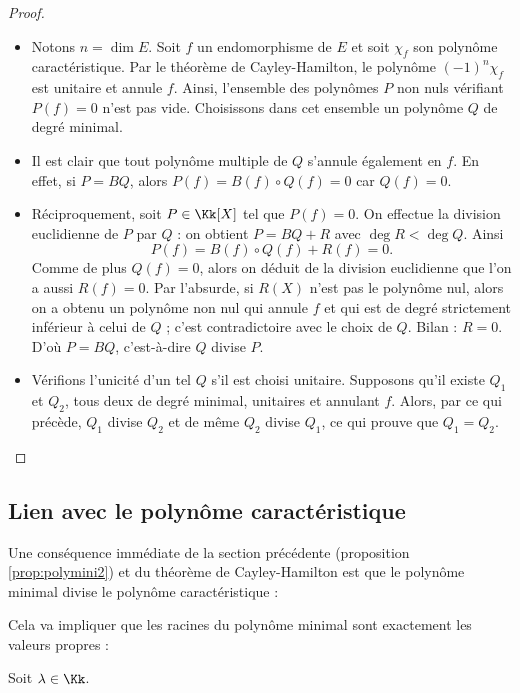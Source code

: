 \documentclass[12pt, class=report,crop=false]{standalone}
\begin{document}
\begin{proof}~
\begin{itemize}
  \item Notons $n=\dim E$. Soit $f$ un endomorphisme de $E$ et soit $\chi_f$ son polynôme caractéristique. Par le théorème de Cayley-Hamilton, le polynôme $(-1)^n\chi_f$ est unitaire et annule $f$.
Ainsi, l'ensemble des polynômes $P$ non nuls vérifiant $P(f)=0$ n'est pas vide. Choisissons dans cet ensemble un polynôme $Q$ de degré minimal. 

  \item Il est clair que tout polynôme multiple de $Q$ s'annule également en $f$. En effet, si $P=BQ$, alors $P(f)=B(f)\circ Q(f)=0$ car $Q(f) = 0$.
 
 
  \item Réciproquement, soit $P\in \Kk[X]$ tel que $P(f)=0$. On effectue la division euclidienne de $P$ par $Q$ : on obtient $P=BQ+R$ avec $\deg R<\deg Q$. Ainsi 
$$P(f)=B(f)\circ Q(f)+R(f)=0.$$
Comme de plus $Q(f)=0$, alors on déduit de la division euclidienne que l'on a aussi $R(f)=0$. Par l'absurde, si $R(X)$ n'est pas le polynôme nul, alors on a obtenu un polynôme non nul qui annule $f$ et qui est de degré strictement inférieur à celui de $Q$ ; c'est contradictoire avec le choix de $Q$. Bilan : $R=0$. D'où $P=BQ$, c'est-à-dire $Q$ divise $P$.

   \item Vérifions l'unicité d'un tel $Q$ s'il est choisi unitaire.
   Supposons qu'il existe $Q_1$ et $Q_2$, tous deux de degré minimal, unitaires et annulant $f$. Alors, par ce qui précède, $Q_1$ divise $Q_2$ et de même $Q_2$ divise $Q_1$, ce qui prouve que $Q_1=Q_2$.
\end{itemize}
\end{proof}





\subsection{Lien avec le polynôme caractéristique}

Une conséquence immédiate de la section précédente (proposition \ref{prop:polymini2}) et du théorème de Cayley-Hamilton est que le polynôme minimal divise le polynôme caractéristique :


Cela va impliquer que les racines du polynôme minimal sont exactement les valeurs propres :
\begin{proposition}
Soit $\lambda \in \Kk$.
\end{proposition} 
\end{document}
